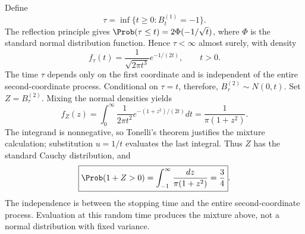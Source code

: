 Define
\[
 \tau=\inf\{t\ge0:B_t^{(1)}=-1\}.
\]
The reflection principle gives $\Prob(\tau\le t)=2\Phi(-1/\sqrt t)$, where $\Phi$ is the standard normal distribution function. Hence $\tau<\infty$ almost surely, with density
\[
 f_\tau(t)=\frac1{\sqrt{2\pi t^3}}e^{-1/(2t)},\qquad t>0.
\]
The time $\tau$ depends only on the first coordinate and is independent of the entire second-coordinate process. Conditional on $\tau=t$, therefore, $B_\tau^{(2)}\sim N(0,t)$. Set $Z=B_\tau^{(2)}$. Mixing the normal densities yields
\[
 f_Z(z)=\int_0^\infty\frac1{2\pi t^2}
            e^{-(1+z^2)/(2t)}dt
       =\frac1{\pi(1+z^2)}.
\]
The integrand is nonnegative, so Tonelli's theorem justifies the mixture calculation; substitution $u=1/t$ evaluates the last integral. Thus $Z$ has the standard Cauchy distribution, and
\[
 \boxed{\Prob(1+Z>0)
   =\int_{-1}^\infty\frac{dz}{\pi(1+z^2)}
   =\frac34}.
\]
The independence is between the stopping time and the entire second-coordinate process. Evaluation at this random time produces the mixture above, not a normal distribution with fixed variance.
